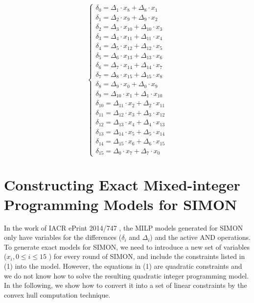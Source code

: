 \documentclass[runningheads]{llncs}
\begin{document}
\begin{equation}
\left\{
\begin{array}{l}
\delta_0    = \Delta_1    \cdot x_8    + \Delta_8    \cdot x_1\\
\delta_1    = \Delta_2    \cdot x_9    + \Delta_9    \cdot x_2\\
\delta_2    = \Delta_3    \cdot x_{10} + \Delta_{10} \cdot x_3\\
\delta_3    = \Delta_4    \cdot x_{11} + \Delta_{11} \cdot x_4\\
\delta_4    = \Delta_5    \cdot x_{12} + \Delta_{12} \cdot x_5\\
\delta_5    = \Delta_6    \cdot x_{13} + \Delta_{13} \cdot x_6\\
\delta_6    = \Delta_7    \cdot x_{14} + \Delta_{14} \cdot x_7\\
\delta_7    = \Delta_8    \cdot x_{15} + \Delta_{15} \cdot x_8\\
\delta_8    = \Delta_9    \cdot x_0    + \Delta_0    \cdot x_9\\
\delta_9    = \Delta_{10} \cdot x_1    + \Delta_1    \cdot x_{10}\\
\delta_{10} = \Delta_{11} \cdot x_2    + \Delta_2    \cdot x_{11}\\
\delta_{11} = \Delta_{12} \cdot x_3    + \Delta_3    \cdot x_{12}\\
\delta_{12} = \Delta_{13} \cdot x_4    + \Delta_4    \cdot x_{13}\\
\delta_{13} = \Delta_{14} \cdot x_5    + \Delta_5    \cdot x_{14}\\
\delta_{14} = \Delta_{15} \cdot x_6    + \Delta_6    \cdot x_{15}\\
\delta_{15} = \Delta_0    \cdot x_7    + \Delta_7    \cdot x_0
\end{array}
\right.
\end{equation}


\section{Constructing Exact Mixed-integer Programming Models for SIMON}
In the work of IACR ePrint 2014/747 \cite{cryptoeprint:2014:747}, the MILP models generated for SIMON only have variables for the differences ($\delta_i$ and $\Delta_i$) and the active AND operations. To generate exact models for SIMON, we need to introduce a new set of variables ($x_i, 0 \leq i \leq 15$ ) for every round of SIMON, and include the constraints listed in (1) into the model. However, the equations in (1) are quadratic constraints and we do not know how to solve the resulting quadratic integer programming model. In the following, we show how to convert it into a set of linear constraints by the convex hull computation technique.
\end{document}
